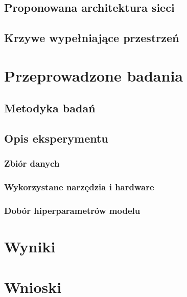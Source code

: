 \documentclass[oneside, mag]{mgr}
\begin{document}
\section{Proponowana architektura sieci}

\section{Krzywe wypełniające przestrzeń}




\chapter{Przeprowadzone badania}

\section{Metodyka badań}

\section{Opis eksperymentu}

\subsection{Zbiór danych}

\subsection{Wykorzystane narzędzia i hardware}

\subsection{Dobór hiperparametrów modelu}



\chapter{Wyniki}


\chapter{Wnioski}



\listoffigures
\end{document}
